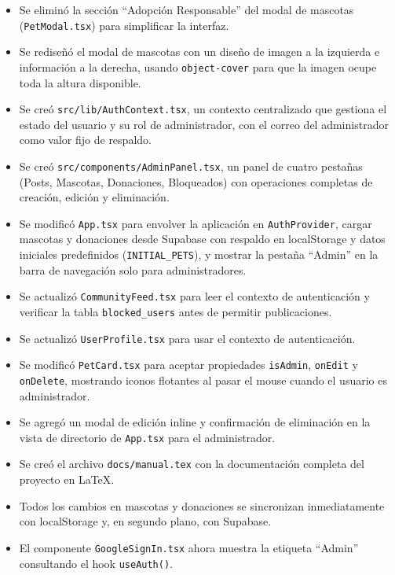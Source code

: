 \documentclass[12pt,a4paper]{article}
\begin{document}
\begin{itemize}
    \item Se eliminó la sección ``Adopción Responsable'' del modal de mascotas (\texttt{PetModal.tsx}) para simplificar la interfaz.
    \item Se rediseñó el modal de mascotas con un diseño de imagen a la izquierda e información a la derecha, usando \texttt{object-cover} para que la imagen ocupe toda la altura disponible.
    \item Se creó \texttt{src/lib/AuthContext.tsx}, un contexto centralizado que gestiona el estado del usuario y su rol de administrador, con el correo del administrador como valor fijo de respaldo.
    \item Se creó \texttt{src/components/AdminPanel.tsx}, un panel de cuatro pestañas (Posts, Mascotas, Donaciones, Bloqueados) con operaciones completas de creación, edición y eliminación.
    \item Se modificó \texttt{App.tsx} para envolver la aplicación en \texttt{AuthProvider}, cargar mascotas y donaciones desde Supabase con respaldo en localStorage y datos iniciales predefinidos (\texttt{INITIAL\_PETS}), y mostrar la pestaña ``Admin'' en la barra de navegación solo para administradores.
    \item Se actualizó \texttt{CommunityFeed.tsx} para leer el contexto de autenticación y verificar la tabla \texttt{blocked\_users} antes de permitir publicaciones.
    \item Se actualizó \texttt{UserProfile.tsx} para usar el contexto de autenticación.
    \item Se modificó \texttt{PetCard.tsx} para aceptar propiedades \texttt{isAdmin}, \texttt{onEdit} y \texttt{onDelete}, mostrando iconos flotantes al pasar el mouse cuando el usuario es administrador.
    \item Se agregó un modal de edición inline y confirmación de eliminación en la vista de directorio de \texttt{App.tsx} para el administrador.
    \item Se creó el archivo \texttt{docs/manual.tex} con la documentación completa del proyecto en LaTeX.
    \item Todos los cambios en mascotas y donaciones se sincronizan inmediatamente con localStorage y, en segundo plano, con Supabase.
    \item El componente \texttt{GoogleSignIn.tsx} ahora muestra la etiqueta ``Admin'' consultando el hook \texttt{useAuth()}.
\end{itemize}
\end{document}
